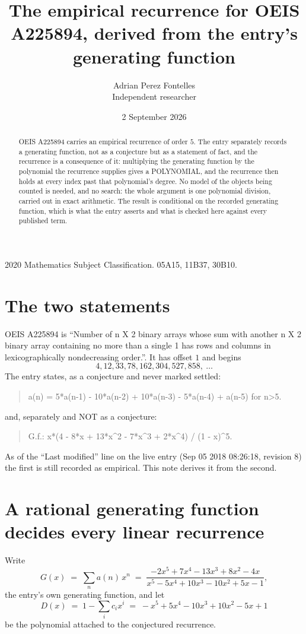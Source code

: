 \documentclass[11pt,a4paper]{article}
\title{The empirical recurrence for OEIS A225894, derived from the entry's generating function}
\author{Adrian Perez Fontelles\\ \small Independent researcher}
\date{2 September 2026}
\theoremstyle{plain}
\theoremstyle{definition}
\begin{document}
\maketitle

\begin{abstract}
OEIS A225894 carries an empirical recurrence of order $5$. The entry separately records a
generating function, not as a conjecture but as a statement of fact, and the recurrence is a
consequence of it: multiplying the generating function by the polynomial the recurrence
supplies gives a POLYNOMIAL, and the recurrence then holds at every index past that
polynomial's degree. No model of the objects being counted is needed, and no search: the
whole argument is one polynomial division, carried out in exact arithmetic. The result is
conditional on the recorded generating function, which is what the entry asserts and what is
checked here against every published term.
\end{abstract}

\noindent\small 2020 Mathematics Subject Classification. 05A15, 11B37, 30B10.\normalsize

\section{The two statements}

OEIS A225894 is ``Number of n X 2 binary arrays whose sum with another n X 2 binary array containing no more than a single 1 has rows and columns in lexicographically nondecreasing order.''. It has offset $1$ and begins
\[
4, 12, 33, 78, 162, 304, 527, 858,\ \dots
\]
The entry states, as a conjecture and never marked settled:
\begin{quote}
a(n) = 5*a(n-1) - 10*a(n-2) + 10*a(n-3) - 5*a(n-4) + a(n-5) for n>5.
\end{quote}
and, separately and NOT as a conjecture:
\begin{quote}
G.f.: x*(4 - 8*x + 13*x\^{}2 - 7*x\^{}3 + 2*x\^{}4) / (1 - x)\^{}5.
\end{quote}
As of the ``Last modified'' line on the live entry (Sep 05 2018 08:26:18, revision 8) the first is still
recorded as empirical. This note derives it from the second.

\section{A rational generating function decides every linear recurrence}

Write
\[
G(x)\;=\;\sum_{n}a(n)\,x^{n}\;=\;\frac{- 2 x^{5} + 7 x^{4} - 13 x^{3} + 8 x^{2} - 4 x}{x^{5} - 5 x^{4} + 10 x^{3} - 10 x^{2} + 5 x - 1},
\]
the entry's own generating function, and let
\[
D(x)\;=\;1-\sum_i c_i x^{i}\;=\;- x^{5} + 5 x^{4} - 10 x^{3} + 10 x^{2} - 5 x + 1
\]
be the polynomial attached to the conjectured recurrence.
\end{document}
